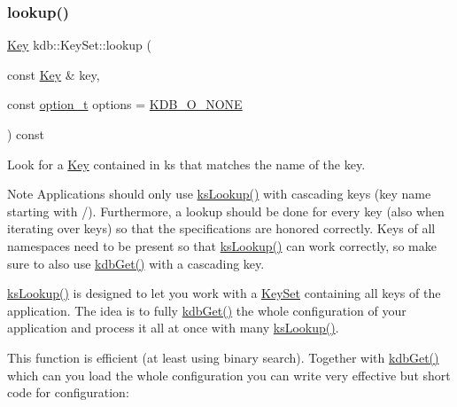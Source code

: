 \subsubsection{\texorpdfstring{lookup()}{lookup()}\hspace{0.1cm}{\footnotesize\ttfamily [1/2]}}
{\footnotesize\ttfamily \hyperlink{classkdb_1_1Key}{Key} kdb\+::\+Key\+Set\+::lookup (\begin{DoxyParamCaption}\item[{const \hyperlink{classkdb_1_1Key}{Key} \&}]{key,  }\item[{const \hyperlink{group__keyset_ga98a3d6a4016c9dad9cbd1a99a9c2a45a}{option\+\_\+t}}]{options = {\ttfamily \hyperlink{group__keyset_gga98a3d6a4016c9dad9cbd1a99a9c2a45aa00738455e0ae843c8720809d8287f370}{K\+D\+B\+\_\+\+O\+\_\+\+N\+O\+NE}} }\end{DoxyParamCaption}) const\hspace{0.3cm}{\ttfamily [inline]}}



Look for a \hyperlink{classkdb_1_1Key}{Key} contained in {\ttfamily ks} that matches the name of the {\ttfamily key}. 

\begin{DoxyNote}{Note}
Applications should only use \hyperlink{group__keyset_gaa34fc43a081e6b01e4120daa6c112004}{ks\+Lookup()} with cascading keys (key name starting with {\ttfamily /}). Furthermore, a lookup should be done for every key (also when iterating over keys) so that the specifications are honored correctly. Keys of all namespaces need to be present so that \hyperlink{group__keyset_gaa34fc43a081e6b01e4120daa6c112004}{ks\+Lookup()} can work correctly, so make sure to also use \hyperlink{group__kdb_ga28e385fd9cb7ccfe0b2f1ed2f62453a1}{kdb\+Get()} with a cascading key.
\end{DoxyNote}
{\ttfamily \hyperlink{group__keyset_gaa34fc43a081e6b01e4120daa6c112004}{ks\+Lookup()}} is designed to let you work with a \hyperlink{classkdb_1_1KeySet}{Key\+Set} containing all keys of the application. The idea is to fully \hyperlink{group__kdb_ga28e385fd9cb7ccfe0b2f1ed2f62453a1}{kdb\+Get()} the whole configuration of your application and process it all at once with many {\ttfamily \hyperlink{group__keyset_gaa34fc43a081e6b01e4120daa6c112004}{ks\+Lookup()}}.

This function is efficient (at least using binary search). Together with \hyperlink{group__kdb_ga28e385fd9cb7ccfe0b2f1ed2f62453a1}{kdb\+Get()} which can you load the whole configuration you can write very effective but short code for configuration\+:


